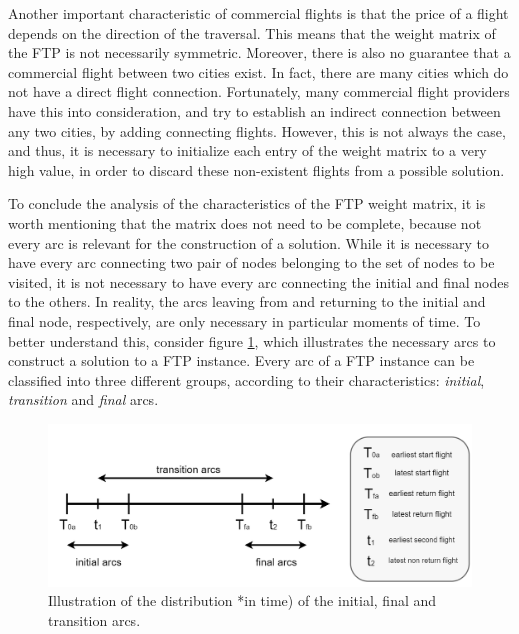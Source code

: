 Another important characteristic of commercial flights is that the price of a flight depends on the direction of the traversal. This means that the weight matrix of the FTP is not necessarily symmetric. Moreover, there is also no guarantee that a commercial flight between two cities exist. In fact, there are many cities which do not have a direct flight connection. Fortunately, many commercial flight providers have this into consideration, and try to establish an indirect connection between any two cities, by adding connecting flights. However, this is not always the case, and thus, it is necessary to initialize each entry of the weight matrix to a very high value, in order to discard these non-existent flights from a possible solution.  

To conclude the analysis of the characteristics of the FTP weight matrix, it is worth mentioning that the matrix does not need to be complete, because not every arc is relevant for the construction of a solution. While it is necessary to have every arc connecting two pair of nodes belonging to the set of nodes to be visited, it is not necessary to have every arc connecting the initial and final nodes to the others. In reality, the arcs leaving from and returning to the initial and final node, respectively, are only necessary in particular moments of time. To better understand this, consider figure \ref{fig:arc_families}, which illustrates the necessary arcs to construct a solution to a FTP instance. Every arc of a FTP instance can be classified into three different groups, according to their characteristics: \textit{initial}, \textit{transition} and \textit{final} arcs.

\begin{figure}[htpb]
  \centering
  \includegraphics[width=\textwidth]{./Figures/system_design/flights_times.png}
  \caption{Illustration of the distribution *in time) of the initial, final and transition arcs.}
  \label{fig:arc_families} 
\end{figure}

